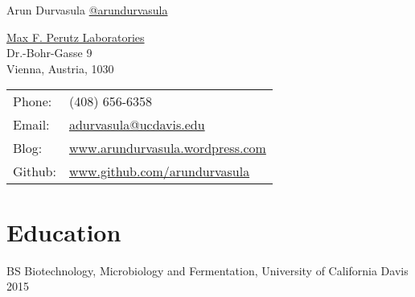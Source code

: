 \documentclass[letterpaper]{article}
\def\name{Arun Durvasula}
\renewenvironment{itemize}{
  \begin{list}{}{
    \setlength{\leftmargin}{1em}
  }
}{
  \end{list}
}
\begin{document}
{\huge \name}
\newline
 \href{https://www.twitter.com/arundurvasula}{@arundurvasula}


\vspace{0.05in}

\begin{minipage}{0.55\linewidth}
  \href{https://www.mfpl.ac.at}{Max F. Perutz Laboratories} \\
  Dr.-Bohr-Gasse 9\\
  Vienna, Austria, 1030
\end{minipage}
\begin{minipage}{0.35\linewidth}
  \begin{tabular}{ll}
    Phone: & (408) 656-6358 \\
    Email: & \href{mailto:adurvasula@ucdavis.edu}{adurvasula@ucdavis.edu} \\
    Blog: & \href{http://www.arundurvasula.wordpress.com/}{www.arundurvasula.wordpress.com} \\
    Github: & \href{https://github.com/arundurvasula/}{www.github.com/arundurvasula} \\
  \end{tabular}
\end{minipage}


\section*{Education}
\begin{itemize}
 \item BS Biotechnology, Microbiology and Fermentation, University of California Davis 2015
\end{itemize}

\end{document}
